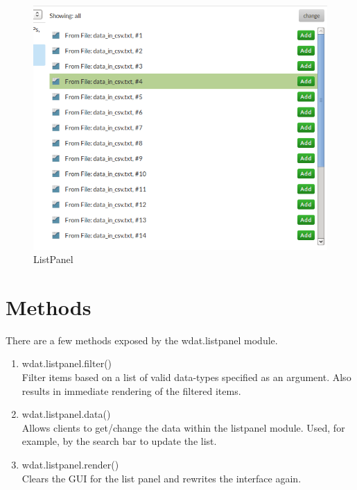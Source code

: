 \begin{figure}[h!t]
  \centering
  \includegraphics[width=\textwidth]{src/images/wdat-list-panel.png}
  \caption{ListPanel}
\end{figure}

\section{Methods}

There are a few methods exposed by the wdat.listpanel module.

\begin{enumerate}
  \item{wdat.listpanel.filter()} \hfill \\
  Filter items based on a list of valid data-types specified as an
  argument.  Also results in immediate rendering of the filtered
  items.

  \item{wdat.listpanel.data()} \hfill \\
  Allows clients to get/change the data within the listpanel module.
  Used, for example, by the search bar to update the list.

  \item{wdat.listpanel.render()} \hfill \\
  Clears the GUI for the list panel and rewrites the interface again.
\end{enumerate}

